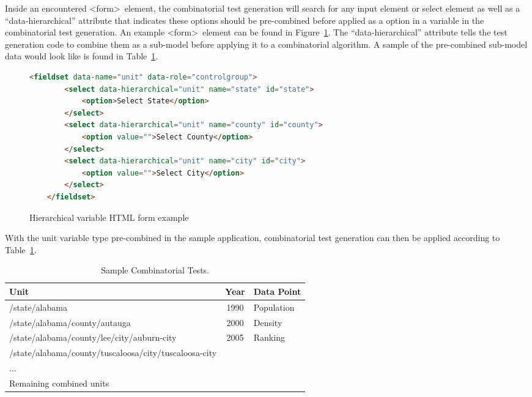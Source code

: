 Inside an encountered \textless form\textgreater\ element, the combinatorial test generation will search for any input element or select element as well as a ``data-hierarchical'' attribute that indicates these options should be pre-combined before applied as a option in a variable in the combinatorial test generation.  An example \textless form\textgreater\ element can be found in Figure~\ref{formVariableHierarchical}.  The ``data-hierarchical'' attribute tells the test generation code to combine them as a sub-model before applying it to a combinatorial algorithm.  A sample of the pre-combined sub-model data would look like is found in Table~\ref{table:sampleTests}.

\begin{figure}
\begin{lstlisting}[language=HTML]
	<fieldset data-name="unit" data-role="controlgroup">
		<select data-hierarchical="unit" name="state" id="state">
		   	<option>Select State</option>
		</select>		
		<select data-hierarchical="unit" name="county" id="county">
			<option value="">Select County</option>
		</select>
		<select data-hierarchical="unit" name="city" id="city">
			<option value="">Select City</option>
		</select>
	</fieldset>
\end{lstlisting}
\caption{Hierarchical variable HTML form example}
\label{formVariableHierarchical}
\end{figure}

With the unit variable type pre-combined in the sample application, combinatorial test generation can then be applied according to Table~\ref{table:sampleTests}.

\begin{table}[h]
	\centering
	\caption{Sample Combinatorial Tests.}
	\begin{tabular}{| l | c | l |}
		\hline
Unit												&	Year		& 	Data Point	\\ \hline
 /state/alabama									&	1990	&	Population	\\ \hline
 /state/alabama/county/autauga						&	2000	&	Density		\\ \hline
 /state/alabama/county/lee/city/auburn-city				&	2005	&	Ranking		\\ \hline
/state/alabama/county/tuscaloosa/city/tuscaloosa-city 	&			&				\\ \hline
...												&			&				\\ \hline
Remaining combined units							&			&				\\
		\hline
	\end{tabular}
	\label{table:sampleTests}
\end{table}

